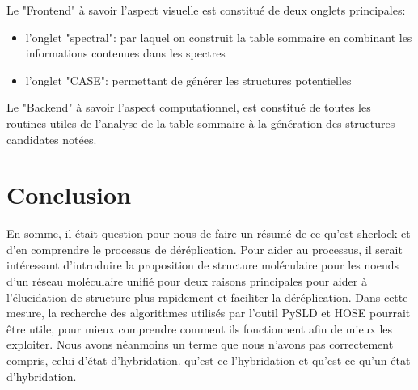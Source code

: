 \documentclass[12pt, french, latin.medieval, a4paper]{report}
\begin{document}
    Le "Frontend" à savoir l'aspect visuelle est constitué de deux onglets principales:
    \begin{itemize}
   	 \item l'onglet "spectral": par laquel on construit la table sommaire en combinant les informations contenues dans les spectres
   	 \item l'onglet "CASE": permettant de générer les structures potentielles
    \end{itemize}

    Le "Backend" à savoir l'aspect computationnel, est constitué de toutes les routines utiles de l'analyse de la table sommaire à la génération des structures candidates notées.
    
    \section{Conclusion}
    En somme, il était question pour nous de faire un résumé de ce qu'est sherlock et d'en comprendre le processus de déréplication.
    Pour aider au processus, il serait intéressant d'introduire la proposition de structure moléculaire pour les noeuds d'un réseau moléculaire unifié pour deux raisons principales
    pour aider à l'élucidation de structure plus rapidement et faciliter la déréplication.
    Dans cette mesure, la recherche des algorithmes utilisés par l'outil PySLD et HOSE pourrait être utile, pour mieux comprendre comment ils fonctionnent afin de mieux les exploiter.
    Nous avons néanmoins un terme que nous n’avons pas correctement compris, celui d'état d'hybridation. qu'est ce l'hybridation et qu'est ce qu'un état d'hybridation.
   

    
\end{document}
